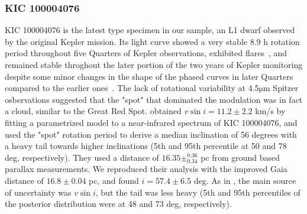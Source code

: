 \documentclass[fleqn,usenatbib,letters]{mnras}%
\newcommand{\FE}{KIC 100004076} %
\begin{document}
\subsubsection{\FE}
\label{sec:propsE}
\FE\; is the latest type specimen in our sample, an L1 dwarf observed by the original Kepler mission. Its light curve showed a very stable 8.9 h rotation period throughout five Quarters of Kepler observations, exhibited flares~\citep{gizis2013}, and remained stable throghout the later portion of the two years of Kepler monitoring despite some minor changes in the shape of the phased curves in later Quarters compared to the earlier ones~\citep{gizis2015}. The lack of rotational variability at 4.5$\mathrm{\mu}$m Spitzer osbervations suggested that the "spot" that dominated the modulation was in fact a cloud, similar to the Great Red Spot\citep{gizis2015}. \citet{gizis2013} obtained $v\sin i = 11.2\pm2.2$ km/s by fitting a parametrized model to a near-infrared spectrum of \FE, and used the "spot" rotation period to derive a median inclination of 56 degrees with a heavy tail towards higher inclinations (5th and 95th percentile at 50 and 78 deg, respectively). They used a distance of $16.35 \pm^{0.36}_{0.34}$ pc from ground based parallax measurements. We reproduced their analysis with the improved Gaia distance of $16.8\pm0.04$ pc, and found $i=57.4 \pm 6.5$ deg. As in \citet{gizis2013}, the main source of uncertainty was $v\sin i$, but the tail was less heavy (5th and 95th percentiles of the posterior distribution were at 48 and 73 deg, respectively).

\end{document}
